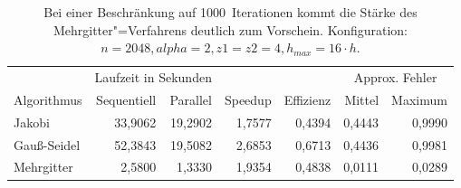 \documentclass[paper = a4]{scrartcl}
\begin{document}
\begin{table}
    \centering
    \begin{tabular}{|l|r|r|r|r|r|r|} \hline
    & \multicolumn{2}{c|}{Laufzeit in Sekunden} & & & \multicolumn{2}{c|}{Approx. Fehler} \\
    Algorithmus & Sequentiell & Parallel & Speedup & Effizienz & Mittel   & Maximum \\ \hline \hline
    Jakobi      & 33,9062     & 19,2902  & 1,7577  & 0,4394    & 0,4443   & 0,9990  \\
    Gauß-Seidel & 52,3843     & 19,5082  & 2,6853  & 0,6713    & 0,4436   & 0,9981  \\
    Mehrgitter  & 2,5800      & 1,3330   & 1,9354  & 0,4838    & 0,0111   & 0,0289  \\ \hline
    \end{tabular}
    \caption{Bei einer Beschränkung auf 1000~Iterationen kommt die Stärke des Mehrgitter"=Verfahrens deutlich zum Vorschein. Konfiguration: \(n=2048, alpha=2, z1=z2=4, h_{max}=16 \cdot h\).}
    \label{tab:f}
\end{table}
\end{document}
